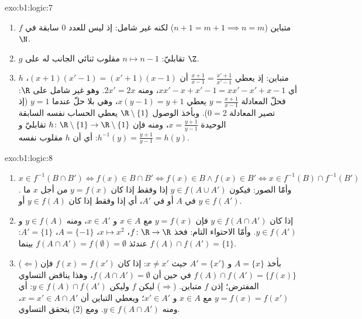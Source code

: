 \begin{solution}{exo:b1:logic:7}
\begin{enumerate}
  \item {} $f$ متباين ($n + 1 = m + 1 \implies n = m$) لكنه غير
        شامل: إذ ليس للعدد $0$ سابقة في $\N$.
  \item {} $g$ تقابليّ:  $n \mapsto n - 1$ مقلوب ثنائي
        الجانب له على $\Z$.
  \item {} $h$ متباين: إذ يعطي $\frac{x+1}{x-1} = \frac{x'+1}{x'-1}$ أن
        $(x+1)(x'-1) = (x'+1)(x-1)$، أي $xx' - x + x' - 1 = xx' -
        x' + x - 1$، ومنه $2x' = 2x$. وهو غير شامل على $\R$:
        فحلّ المعادلة $y = \frac{x+1}{x-1}$ يعطي $x(y - 1) = y + 1$،
        وهي بلا حلّ عندما $y = 1$ (إذ تصير المعادلة $0 = 2$).
        وبأخذ  الوصول $\R \setminus \{1\}$ يعطي الحساب نفسه
        السابقة الوحيدة $x = \frac{y+1}{y-1}$، ومنه فإن
        $h \colon \R \setminus \{1\} \to \R \setminus \{1\}$
        تقابليّ و $h^{-1}(y) = \frac{y+1}{y-1} = h(y)$: أي أن $h$ مقلوب
        نفسه.
\end{enumerate}
\end{solution}

\begin{solution}{exo:b1:logic:8}
\begin{enumerate}
  \item $x \in f^{-1}(B \cap B') \iff f(x) \in B \cap B' \iff f(x) \in
        B \land f(x) \in B' \iff x \in f^{-1}(B) \cap f^{-1}(B')$.
        وأمّا الصور: فيكون $y \in f(A \cup A')$ إذا وفقط إذا كان
        $y = f(x)$ من أجل $x$ ما في $A$ أو في $A'$، أي إذا وفقط إذا
        كان $y \in f(A)$ أو $y \in f(A')$.
  \item إذا كان $y \in f(A \cap A')$ فإن $y = f(x)$ مع $x \in A$
        و $x \in A'$، ومنه $y \in f(A)$ و $y \in f(A')$. وأمّا
        الاحتواء التام: فخذ $f \colon \R \to \R$، $x \mapsto x^2$،
        $A = \{-1\}$، $A' = \{1\}$: عندئذ $f(A \cap A') = f(\emptyset) = \emptyset$
        بينما $f(A) \cap f(A') = \{1\}$.
  \item ($\Leftarrow$) بأخذ $A = \{x\}$ و $A' = \{x'\}$ حيث $x \neq
        x'$: إذا كان $f(x) = f(x')$ فإن $f(A) \cap f(A') = \{f(x)\}$
        في حين أن $f(A \cap A') = \emptyset$، وهذا يناقض التساوي
        المفترض؛ إذن $f$ متباين. ($\Rightarrow$) ليكن $f$ 
        وليكن $y \in f(A) \cap f(A')$: أي $y = f(x) = f(x')$ مع
        $x \in A$ و $x' \in A'$؛ ويعطي التباين أن $x = x' \in A \cap
        A'$، ومنه $y \in f(A \cap A')$. ومع (2) يتحقق التساوي.
\end{enumerate}
\end{solution}

